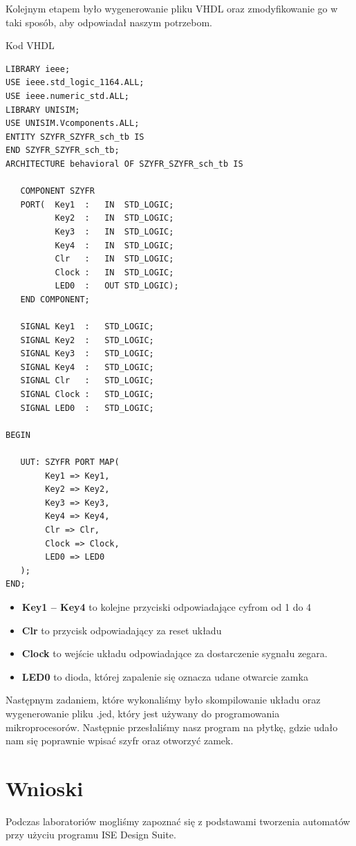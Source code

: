 \documentclass[12pt,a4paper,titlepage]{article}
\begin{document}
Kolejnym etapem było wygenerowanie pliku VHDL oraz zmodyfikowanie go w taki sposób, aby odpowiadał naszym potrzebom.

\begin{listing}[H]
\caption{Kod VHDL}
\begin{verbatim}
LIBRARY ieee;
USE ieee.std_logic_1164.ALL;
USE ieee.numeric_std.ALL;
LIBRARY UNISIM;
USE UNISIM.Vcomponents.ALL;
ENTITY SZYFR_SZYFR_sch_tb IS
END SZYFR_SZYFR_sch_tb;
ARCHITECTURE behavioral OF SZYFR_SZYFR_sch_tb IS 

   COMPONENT SZYFR
   PORT(  Key1  :   IN  STD_LOGIC; 
          Key2  :   IN  STD_LOGIC; 
          Key3  :   IN  STD_LOGIC; 
          Key4  :   IN  STD_LOGIC; 
          Clr   :   IN  STD_LOGIC; 
          Clock :   IN  STD_LOGIC; 
          LED0  :   OUT STD_LOGIC);
   END COMPONENT;

   SIGNAL Key1  :   STD_LOGIC;
   SIGNAL Key2  :   STD_LOGIC;
   SIGNAL Key3  :   STD_LOGIC;
   SIGNAL Key4  :   STD_LOGIC;
   SIGNAL Clr   :   STD_LOGIC;
   SIGNAL Clock :   STD_LOGIC;
   SIGNAL LED0  :   STD_LOGIC;

BEGIN

   UUT: SZYFR PORT MAP(
		Key1 => Key1, 
		Key2 => Key2, 
		Key3 => Key3, 
		Key4 => Key4, 
		Clr => Clr, 
		Clock => Clock, 
		LED0 => LED0
   );
END;
\end{verbatim}
\end{listing}

\begin{itemize}
    \item \textbf{Key1 -- Key4} to kolejne przyciski odpowiadające cyfrom od 1 do 4
    \item \textbf{Clr} to przycisk odpowiadający za reset układu
    \item \textbf{Clock} to wejście układu odpowiadające za dostarczenie sygnału zegara.
    \item \textbf{LED0} to dioda, której zapalenie się oznacza udane otwarcie zamka
\end{itemize}
Następnym zadaniem, które wykonaliśmy było skompilowanie układu oraz wygenerowanie pliku .jed, który jest używany do programowania mikroprocesorów. Następnie przesłaliśmy nasz program na płytkę, gdzie udało nam się poprawnie wpisać szyfr oraz otworzyć zamek.

\section{Wnioski}
Podczas laboratoriów mogliśmy zapoznać się z podstawami tworzenia automatów przy użyciu programu ISE Design Suite.
\end{document}
